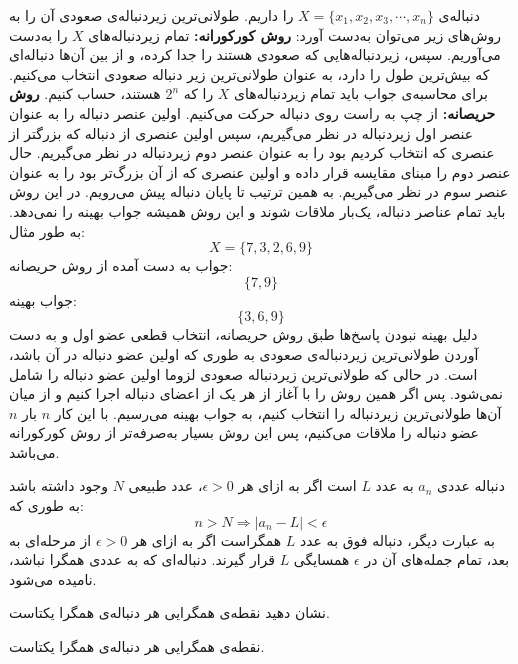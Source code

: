 \p
دنباله‌ی
 $X = \{x_1, x_2, x_3, \cdots, x_n\}$
را داریم. طولانی‌ترین زیردنباله‌ی صعودی
آن را به روش‌های زیر می‌توان به‌دست آورد:
\p
\textbf{روش کورکورانه:} 
تمام زیردنباله‌های
$X$
را به‌دست می‌آوریم. سپس، زیردنباله‌هایی که صعودی هستند را جدا کرده،
و از بين آن‌ها دنباله‌ای که بيش‌ترین طول را دارد، به عنوان طولانی‌ترین زیر دنباله صعودی انتخاب می‌کنيم.
برای محاسبه‌ی جواب باید تمام زیردنباله‌های
$X$
 را که
 $2^n$
 هستند، حساب کنیم.
\p
\textbf{روش حریصانه:} 
از چپ به راست روی دنباله حرکت می‌کنيم. اولين عنصر دنباله را به عنوان عنصر اول زیردنباله در نظر می‌گيریم، سپس اولين عنصری از دنباله که بزرگتر از عنصری که انتخاب کردیم بود را به عنوان عنصر دوم زیردنباله در نظر می‌گيریم. حال عنصر دوم را مبنای مقایسه قرار داده و اولین عنصری که از آن بزرگ‌تر بود را به عنوان عنصر سوم در نظر می‌گیریم. به همين ترتيب تا پایان دنباله پيش می‌رویم. در این روش  باید تمام عناصر دنباله، یک‌بار ملاقات شوند و این روش هميشه جواب بهينه را نمی‌دهد. به طور مثال:
 $$X = \{7, 3 ,2 ,6 ,9\}$$
جواب به دست آمده از روش حریصانه:
 $$\{7, 9\}$$
جواب بهينه:
$$\{3, 6, 9\}$$
\p
دلیل بهینه نبودن پاسخ‌ها طبق روش حریصانه، انتخاب قطعی عضو اول و به دست آوردن طولانی‌ترین زیردنباله‌ی صعودی به طوری که اولین عضو دنباله در آن باشد، است. در حالی که طولانی‌ترین زیردنباله صعودی لزوما اولین عضو دنباله را شامل نمی‌شود. پس اگر همین روش را با آغاز از هر یک از اعضای دنباله اجرا کنیم و از میان آن‌ها طولانی‌ترین زیردنباله را انتخاب کنیم، به جواب بهینه می‌رسیم. با این کار
$n$
بار
$n$
عضو دنباله را ملاقات می‌کنیم، پس این روش بسیار به‌صرفه‌تر از روش کورکورانه می‌باشد.



\begin{DEFINITION}
	\p
دنباله عددی
$a_n$
 به عدد 
$L$
است اگر به ازای هر
$\epsilon > 0$،
عدد طبیعی
$N$
وجود داشته باشد به طوری که:
$$n > N \Rightarrow |a_n - L| < \epsilon$$
به عبارت دیگر، دنباله فوق به عدد
$L$
همگراست اگر به ازای هر
$\epsilon > 0$
از مرحله‌ای به بعد، تمام جمله‌های آن در
$\epsilon$
 همسایگی
$L$
 قرار گیرند. دنباله‌ای که به عددی همگرا نباشد، 
  نامیده می‌شود.
\end{DEFINITION}

\begin{PROBLEM}
  \p
  نشان دهید نقطه‌ی همگرایی هر دنباله‌ی همگرا یکتاست.

\end{PROBLEM}
    \begin{THEOREM}
      نقطه‌ی همگرایی هر دنباله‌ی همگرا یکتاست.
    \end{THEOREM}

